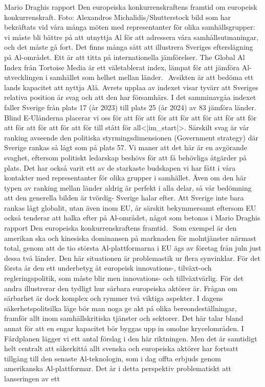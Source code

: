 {Mario Draghis rapport Den europeiska konkurrenskraftens framtid om europeisk konkurrenskraft.
Foto: Alexandros Michalidis/Shutterstock
bild som har bekräftats vid våra många möten med representanter för olika samhällsgrupper: vi måste bli bättre på att utnyttja Al för att adressera våra samhållsutmaningar, och det måste gå fort.
Det finns många sått att illustrera Sveriges efterslägning på Al-området. Ett är att titta på internationella jämförelser. The Global Al Index från Tortoise Media är ett väletablerat index, lämpat för att jämföra Al-utvecklingen i samhället som helhet mellan länder. \({ }^{}\) Avsikten är att bedöma ett lands kapacitet att nyttja Alå. Avrets upplaa av indexet visar tyvärr att Sveriges relativa position är svag och att den har församhärs. I det samminavgåa indexet faller Sverige från plats 17 (år 2023) till plats 25 (år 2024) av 83 jämföra länder. Blind E-Ulånderna placerar vi oss för att för att för att för att för att för att för att för att för att för att för till stått för all<|im_start|>. Särskilt svag är vår ranking avseende den politiska styrmingsdimensionen (Government strategy) där Sverige rankas så lågt som på plats 57. Vi maner att det här är en avgörande svaghet, eftersom politiskt ledarskap beshövs för att få behövliga åtgärder på plats. Det har också varit ett av de starkaste budskapen vi har fått i våra kontakter med representanter för olika grupper i samhället.
Även om den här typen av ranking mellan länder aldrig är perfekt i alla delar, så vår bedömning att den generella bilden är tvördig- Sverige halar efter. Att Sverige inte bara rankas lågt globalit, utan även inom EU, år särskit bekymmersamt eftersom EU också tenderar att halka efter på Al-området, något som betonas i Mario Draghis rapport Den europeiska konkurrenskraftens framtid. \({ }^{}\) Som exempel är den amerikan ska och kinesiska dominansen på marknaden för molntjänster närmast total, genom att de tio största Al-plattformarna i EU ägs av företag från juln just dessa två länder. Den här situationen är problemastik ur flera synvinklar. För det första år den ett underbetyg åt europeisk innovations-, tilväxt-och regleringspolitik, som måste blir men innovations- och tillväxtvärlig. För det andra illustrerar den tydligt hur särbara europeiska aktörer är.
Frågan om särbarhet är dock komplex och rymmer två viktiga aspekter. I dagens säkerhetspolitsilka läge bör man noga ge akt på olika bereondeställningar, framför allt inom samhällskritiska tjänster och sektorer. Det här talar bland annat för att en engar kapacitet bör byggas upp in omolne krycelområden. I Fårdplanen lägger vi ett antal förslag i den här riktningen. Men det är samtidigt helt centralt att säkerkittå allt svenska och europeiska aktörer har fortsatt tillgång till den senaste Al-teknologin, som i dag offta erbjuds genom amerikanska Al-plattformar. Det år i detta perspektiv problematiskt att lanseringen av ett

}
